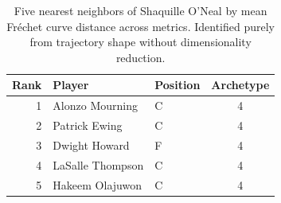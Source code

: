 \begin{table}[htbp]
  \centering\small
  \begin{tabular}{rllc}
    \toprule
    Rank & Player & Position & Archetype \\
    \midrule
    1 & Alonzo Mourning & C & 4 \\
    2 & Patrick Ewing & C & 4 \\
    3 & Dwight Howard & F & 4 \\
    4 & LaSalle Thompson & C & 4 \\
    5 & Hakeem Olajuwon & C & 4 \\
    \bottomrule
  \end{tabular}
  \caption{Five nearest neighbors of Shaquille O'Neal by mean Fr\'{e}chet curve distance across metrics. Identified purely from trajectory shape without dimensionality reduction.}
  \label{tab:Shaquille_O_Neal_frechet_curve_neighbors}
\end{table}

